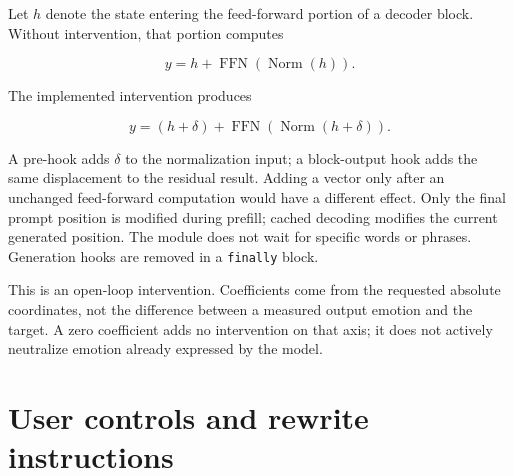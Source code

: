\documentclass[manuscript,screen,nonacm]{acmart}
\begin{document}
Let \(h\) denote the state entering the feed-forward portion of a
decoder block. Without intervention, that portion computes

\[
y=h+\operatorname{FFN}(\operatorname{Norm}(h)).
\]

The implemented intervention produces

\[
y=(h+\delta)+\operatorname{FFN}(\operatorname{Norm}(h+\delta)).
\]

A pre-hook adds \(\delta\) to the normalization input; a block-output
hook adds the same displacement to the residual result. Adding a vector
only after an unchanged feed-forward computation would have a different
effect. Only the final prompt position is modified during prefill;
cached decoding modifies the current generated position. The module does
not wait for specific words or phrases. Generation hooks are removed in
a \nolinkurl{finally} block.

This is an open-loop intervention. Coefficients come from the requested
absolute coordinates, not the difference between a measured output
emotion and the target. A zero coefficient adds no intervention on that
axis; it does not actively neutralize emotion already expressed by the
model.


\section{User controls and rewrite
instructions}\label{user-controls-and-rewrite-instructions}
\end{document}
